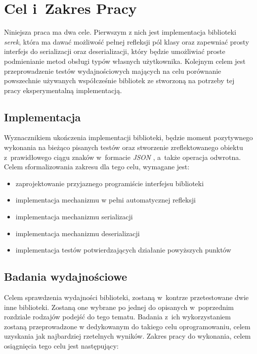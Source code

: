 \documentclass[12pt]{article}
\newcommand{\nonpl}[1]{{\it #1}}
\newcommand{\JSON}{\nonpl{JSON} }
\newcommand{\serek}{\nonpl{serek}}
\begin{document}
	{
		\section{Cel i~Zakres Pracy}

		Niniejsza praca ma dwa cele. Pierwszym z nich jest implementacja biblioteki \serek, która ma dawać możliwość pełnej refleksji pól klasy oraz zapewniać
		prosty interfejs do serializacji oraz deserializacji, który będzie umożliwiać proste podmienianie metod obsługi typów własnych użytkownika. Kolejnym celem
		jest przeprowadzenie testów wydajnościowych mających na celu porównanie powszechnie używanych współcześnie bibliotek ze stworzoną na potrzeby tej pracy eksperymentalną
		implementacją.

		{
			\subsection{Implementacja}

			Wyznacznikiem ukończenia implementacji biblioteki, będzie moment pozytywnego wykonania na bieżąco pisanych testów oraz stworzenie zreflektowanego obiektu z~prawidłowego
			ciągu znaków w~formacie \JSON, a~także operacja odwrotna. Celem sformalizowania zakresu dla tego celu, wymagane jest:

			\begin{itemize}
				\setlength\itemsep{0mm}
				\item zaprojektowanie przyjaznego programiście interfejsu biblioteki
				\item implementacja mechanizmu w pełni automatycznej refleksji
				\item implementacja mechanizmu serializacji
				\item implementacja mechanizmu deserializacji
				\item implementacja testów potwierdzających działanie powyższych punktów
			\end{itemize}
		}

		{
			\newpage
			\subsection{Badania wydajnościowe}

			Celem sprawdzenia wydajności biblioteki, zostaną w~kontrze przetestowane dwie inne biblioteki. Zostaną one wybrane po jednej do opisanych w~poprzednim rozdziale
			rodzajów podejść do tego tematu. Badania z~ich wykorzystaniem zostaną przeprowadzone w dedykowanym do takiego celu oprogramowaniu, celem uzyskania jak najbardziej rzetelnych
			wyników. Zakres pracy do wykonania, celem osiągnięcia tego celu jest następujący:

}}
\end{document}
